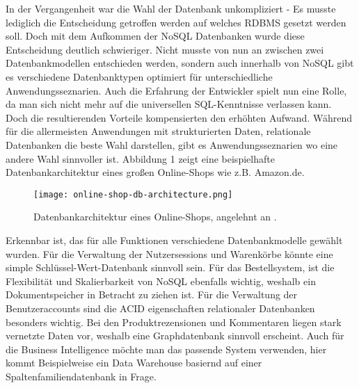 In der Vergangenheit war die Wahl der Datenbank unkompliziert - Es musste lediglich die Entscheidung getroffen werden auf welches RDBMS gesetzt werden soll. Doch mit dem Aufkommen der NoSQL Datenbanken wurde diese Entscheidung deutlich schwieriger. Nicht musste von nun an zwischen zwei Datenbankmodellen entschieden werden, sondern auch innerhalb von NoSQL gibt es verschiedene Datenbanktypen optimiert für unterschiedliche Anwendungsseznarien. Auch die Erfahrung der Entwickler spielt nun eine Rolle, da man sich nicht mehr auf die universellen SQL-Kenntnisse verlassen kann. Doch die resultierenden Vorteile kompensierten den erhöhten Aufwand. Während für die allermeisten Anwendungen mit strukturierten Daten, relationale Datenbanken die beste Wahl darstellen, gibt es Anwendungsseznarien wo eine andere Wahl sinnvoller ist. Abbildung 1 zeigt eine beispielhafte Datenbankarchitektur eines großen Online-Shops wie z.B. Amazon.de.

\begin{figure}[H]
    \centering
    \texttt{[image: online-shop-db-architecture.png]}
    \caption{Datenbankarchitektur eines Online-Shops, angelehnt an \cite{donofrioBigDataAnalytics2021}.}
\end{figure}

Erkennbar ist, das für alle Funktionen verschiedene Datenbankmodelle gewählt wurden. Für die Verwaltung der Nutzersessions und Warenkörbe könnte eine simple Schlüssel-Wert-Datenbank sinnvoll sein. Für das Bestellsystem, ist die Flexibilität und Skalierbarkeit von NoSQL ebenfalls wichtig, weshalb ein Dokumentspeicher in Betracht zu ziehen ist. Für die Verwaltung der Benutzeraccounts sind die ACID eigenschaften relationaler Datenbanken besonders wichtig. Bei den Produktrezensionen und Kommentaren liegen stark vernetzte Daten vor, weshalb eine Graphdatenbank sinnvoll erscheint. Auch für die Business Intelligence möchte man das passende System verwenden, hier kommt Beispielweise ein Data Warehouse basiernd auf einer Spaltenfamiliendatenbank in Frage.